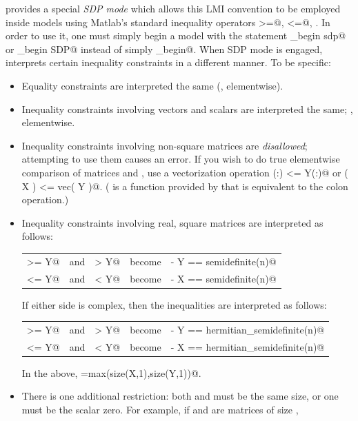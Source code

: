 \documentclass[12pt]{article}
\begin{document}
\cvx provides a special \emph{SDP mode} which allows this
LMI convention to be employed inside \cvx models
using Matlab's standard inequality operators \verb@>=@, \verb@<=@, \etc.
In order to use it, one must simply begin a model with the statement
\verb@cvx_begin sdp@ or \verb@cvx_begin SDP@ instead of simply \verb@cvx_begin@. When SDP mode 
is engaged, \cvx interprets certain inequality constraints in a
different manner. To be specific:
\begin{itemize}
\item Equality constraints are interpreted the same (\ie, elementwise).
\item Inequality constraints involving vectors and scalars are interpreted
      the same; \ie, elementwise.
\item Inequality constraints involving non-square matrices are \emph{disallowed};
      attempting to use them causes an error. If you wish to do true elementwise
      comparison of matrices \verb@X@ and \verb@Y@, use a vectorization
      operation \verb@X(:) <= Y(:)@ or \verb@vec( X ) <= vec( Y )@. (\verb@vec@
      is a function provided by \cvx that is equivalent to the colon operation.)
\item Inequality constraints involving real, square matrices are interpreted as follows:
	\begin{center}
	\begin{tabular}{ccccc}
	\verb@X >= Y@ & and & \verb@X > Y@ & become & \verb@X - Y == semidefinite(n)@ \\
	\verb@X <= Y@ & and & \verb@X < Y@  & become & \verb@Y - X == semidefinite(n)@
	\end{tabular}
	\end{center}
      If either side is complex, then the inequalities are
      interpreted as follows:
	\begin{center}
	\begin{tabular}{ccccc}
	\verb@X >= Y@ & and & \verb@X > Y@ & become & \verb@X - Y == hermitian_semidefinite(n)@ \\
	\verb@X <= Y@ & and & \verb@X < Y@  & become & \verb@Y - X == hermitian_semidefinite(n)@
	\end{tabular}
	\end{center}
      In the above, \verb@n=max(size(X,1),size(Y,1))@.
\item There is one additional restriction: both
      \verb@X@ and \verb@Y@ must be the same size, or one must
      be the scalar zero. For example, if \verb@X@ and \verb@Y@ are
      matrices of size \verb@n@,

\end{itemize}
\end{document}
